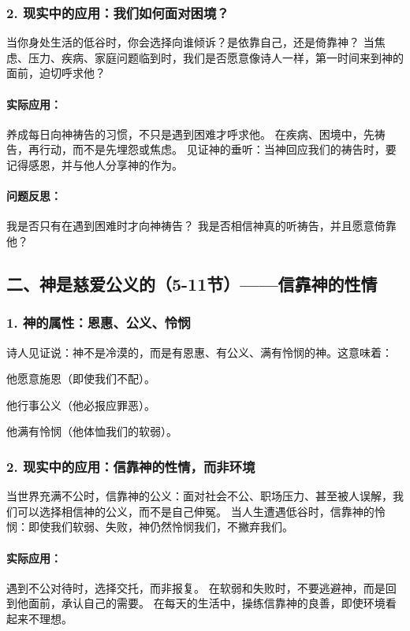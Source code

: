 \documentclass[a4paper, 12pt]{article}
\begin{document}
\subsubsection*{2. 现实中的应用：我们如何面对困境？}

当你身处生活的低谷时，你会选择向谁倾诉？是依靠自己，还是倚靠神？
当焦虑、压力、疾病、家庭问题临到时，我们是否愿意像诗人一样，第一时间来到神的面前，迫切呼求他？
\paragraph*{实际应用：}

养成每日向神祷告的习惯，不只是遇到困难才呼求他。
在疾病、困境中，先祷告，再行动，而不是先埋怨或焦虑。
见证神的垂听：当神回应我们的祷告时，要记得感恩，并与他人分享神的作为。
\paragraph*{问题反思：}

我是否只有在遇到困难时才向神祷告？
我是否相信神真的听祷告，并且愿意倚靠他？
\subsection*{二、神是慈爱公义的（5-11节）——信靠神的性情}

\subsubsection*{1. 神的属性：恩惠、公义、怜悯}
诗人见证说：神不是冷漠的，而是有恩惠、有公义、满有怜悯的神。这意味着：

他愿意施恩（即使我们不配）。

他行事公义（他必报应罪恶）。

他满有怜悯（他体恤我们的软弱）。
\subsubsection*{2. 现实中的应用：信靠神的性情，而非环境}

当世界充满不公时，信靠神的公义：面对社会不公、职场压力、甚至被人误解，我们可以选择相信神的公义，而不是自己伸冤。
当人生遭遇低谷时，信靠神的怜悯：即使我们软弱、失败，神仍然怜悯我们，不撇弃我们。
\paragraph*{实际应用：}

遇到不公对待时，选择交托，而非报复。
在软弱和失败时，不要逃避神，而是回到他面前，承认自己的需要。
在每天的生活中，操练信靠神的良善，即使环境看起来不理想。
\end{document}
